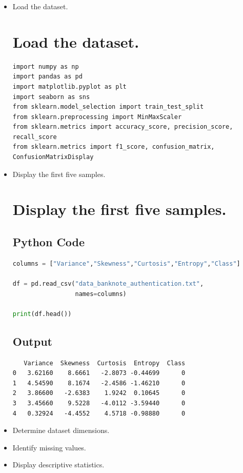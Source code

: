 \documentclass[11pt]{article}
\begin{document}
\begin{itemize}
\item Load the dataset.
\section{Load the dataset.}

\begin{lstlisting}
import numpy as np
import pandas as pd
import matplotlib.pyplot as plt
import seaborn as sns
from sklearn.model_selection import train_test_split
from sklearn.preprocessing import MinMaxScaler
from sklearn.metrics import accuracy_score, precision_score, recall_score
from sklearn.metrics import f1_score, confusion_matrix, ConfusionMatrixDisplay

\end{lstlisting}

\item Display the first five samples.
\section{Display the first five samples.}

\subsection{Python Code}

\begin{lstlisting}[language=Python]
columns = ["Variance","Skewness","Curtosis","Entropy","Class"]

df = pd.read_csv("data_banknote_authentication.txt",
                 names=columns)

print(df.head())
\end{lstlisting}

\subsection{Output}

\begin{verbatim}
   Variance  Skewness  Curtosis  Entropy  Class
0   3.62160    8.6661   -2.8073 -0.44699      0
1   4.54590    8.1674   -2.4586 -1.46210      0
2   3.86600   -2.6383    1.9242  0.10645      0
3   3.45660    9.5228   -4.0112 -3.59440      0
4   0.32924   -4.4552    4.5718 -0.98880      0
\end{verbatim}
\item Determine dataset dimensions.
\item Identify missing values.
\item Display descriptive statistics.

\end{itemize}
\end{document}
